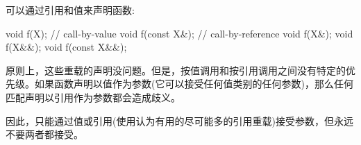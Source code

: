 可以通过引用和值来声明函数:

\begin{cppcode}
void f(X); // call-by-value
void f(const X&); // call-by-reference
void f(X&);
void f(X&&);
void f(const X&&);
\end{cppcode}

原则上，这些重载的声明没问题。但是，按值调用和按引用调用之间没有特定的优先级。如果函数声明以值作为参数(它可以接受任何值类别的任何参数)，那么任何匹配声明以引用作为参数都会造成歧义。

因此，只能通过值或引用(使用认为有用的尽可能多的引用重载)接受参数，但永远不要两者都接受。


































































